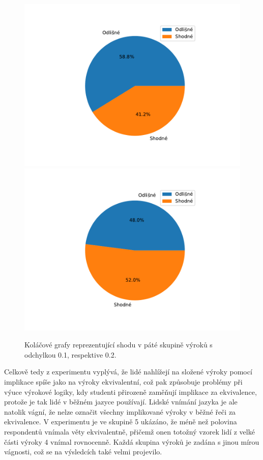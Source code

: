     \begin{figure}[H]
    \caption{Koláčové grafy reprezentující shodu v páté skupině výrok\r u s odchylkou 0.1, respektive 0.2.}
                \includegraphics[scale=0.5]{template-fig/group4.pdf}
                \includegraphics[scale=0.5]{template-fig/group44.pdf}
            \end{figure}


Celkově tedy z experimentu vyplývá, že lidé nahlížejí na složené výroky pomocí implikace spíše jako na výroky ekvivalentní, což pak zp\r usobuje problémy při výuce výrokové logiky, kdy studenti přirozeně zamě\v nují implikace za ekvivalence, protože je tak lidé v běžném jazyce používají. Lidské vnímání jazyka je ale natolik vágní, že nelze označit všechny implikované výroky v běžné řeči za ekvivalence. V experimentu je ve skupině 5 ukázáno, že méně než polovina respondent\r u vnímala věty ekvivalentně, přičemž onen totožný vzorek lidí z velké části výroky 4 vnímal rovnocenně. Každá skupina výrok\r u je zadána s jinou mírou vágnosti, což se na výsledcích také velmi projevilo.

